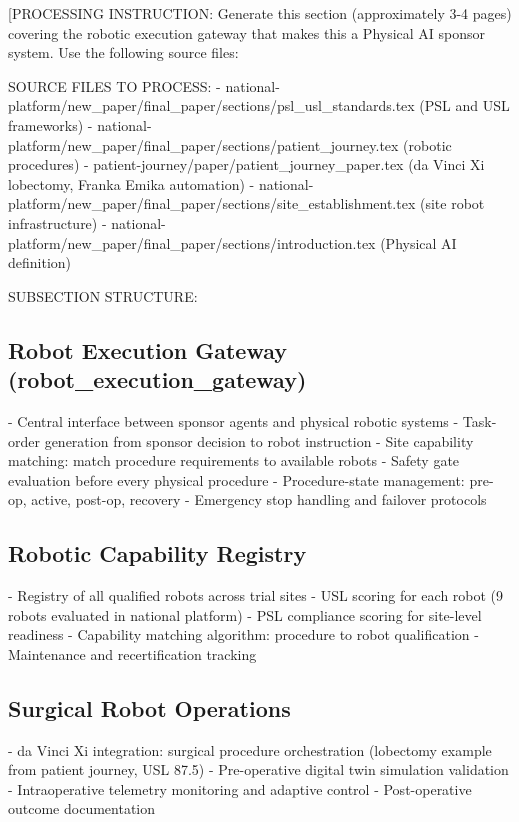 
[PROCESSING INSTRUCTION: Generate this section (approximately 3-4 pages) covering the robotic
execution gateway that makes this a Physical AI sponsor system. Use the following source files:

SOURCE FILES TO PROCESS:
- national-platform/new\_paper/final\_paper/sections/psl\_usl\_standards.tex (PSL and USL frameworks)
- national-platform/new\_paper/final\_paper/sections/patient\_journey.tex (robotic procedures)
- patient-journey/paper/patient\_journey\_paper.tex (da Vinci Xi lobectomy, Franka Emika automation)
- national-platform/new\_paper/final\_paper/sections/site\_establishment.tex (site robot infrastructure)
- national-platform/new\_paper/final\_paper/sections/introduction.tex (Physical AI definition)

SUBSECTION STRUCTURE:

\subsection{Robot Execution Gateway (robot\_execution\_gateway)}
- Central interface between sponsor agents and physical robotic systems
- Task-order generation from sponsor decision to robot instruction
- Site capability matching: match procedure requirements to available robots
- Safety gate evaluation before every physical procedure
- Procedure-state management: pre-op, active, post-op, recovery
- Emergency stop handling and failover protocols

\subsection{Robotic Capability Registry}
- Registry of all qualified robots across trial sites
- USL scoring for each robot (9 robots evaluated in national platform)
- PSL compliance scoring for site-level readiness
- Capability matching algorithm: procedure to robot qualification
- Maintenance and recertification tracking

\subsection{Surgical Robot Operations}
- da Vinci Xi integration: surgical procedure orchestration
  (lobectomy example from patient journey, USL 87.5)
- Pre-operative digital twin simulation validation
- Intraoperative telemetry monitoring and adaptive control
- Post-operative outcome documentation

